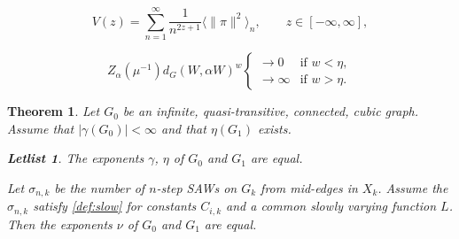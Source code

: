 \documentclass[10pt,a4paper]{amsart}
\newtheorem{theorem}{Theorem}
\newtheorem{letlist}{Letlist}
\renewcommand\a{\alpha}
\newcommand\g{\gamma}
\newcommand\oo{\infty}
\newcommand\s{\sigma}
\begin{document}
\begin{equation}\label{def0}
V(z)=\sum_{n=1}^{\infty}\frac{1}{n^{2z+1}} \langle \|\pi\|^2 \rangle_n,
\qquad z \in [-\oo,\oo],
\end{equation}

\begin{equation}\label{dd1}
Z_\a(\mu^{-1})d_G(W,\a W)^{w} 
\begin{cases} \to 0 &\text{if } w<\eta,\\
\to\infty &\text{if } w>\eta. 
\end{cases}
\end{equation}

\begin{theorem}\label{thm:main2'}
Let $G_0$ be an infinite, quasi-transitive, connected, cubic graph.
Assume that $|\g(G_0)|<\oo$ and that $\eta(G_1)$ exists.
\begin{letlist}
\item The exponents $\g$, $\eta$ of $G_0$ and $G_1$ are equal.
\item  Let $\sigma_{n,k}$ be
the number of $n$-step SAWs on $G_k$ from mid-edges in $X_k$.
Assume the $\s_{n,k}$ satisfy \eqref{def:slow} for constants
$C_{i,k}$ and a common slowly varying function $L$. Then
the exponents $\nu$ of $G_0$ and $G_1$ are equal.
\end{letlist}
\end{theorem}
\end{document}
